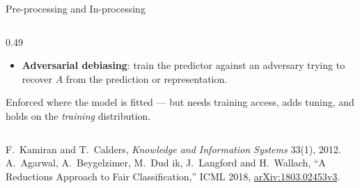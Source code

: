 \begin{frame}{Pre-processing and In-processing}
\begin{columns}[T]
\begin{column}{0.49\textwidth}
\begin{itemize}
                      $\lambda$ is an explicit dial on the trade-off.
                \item \textbf{Adversarial debiasing}: train the predictor against an adversary
                      trying to recover $A$ from the prediction or representation.
            \end{itemize}
            \vspace{0.4em}
            {\scriptsize Enforced where the model is fitted --- but needs training access, adds
            tuning, and holds on the \emph{training} distribution.}
        \end{column}
    \end{columns}

    \vspace{0.4em}
    {\scriptsize F.~Kamiran and T.~Calders, \emph{Knowledge and Information Systems} 33(1), 2012.
    A.~Agarwal, A.~Beygelzimer, M.~Dud ik, J.~Langford and H.~Wallach, ``A Reductions
    Approach to Fair Classification,'' ICML 2018,
    \href{https://arxiv.org/abs/1803.02453v3}{arXiv:1803.02453v3}.}
\end{frame}

